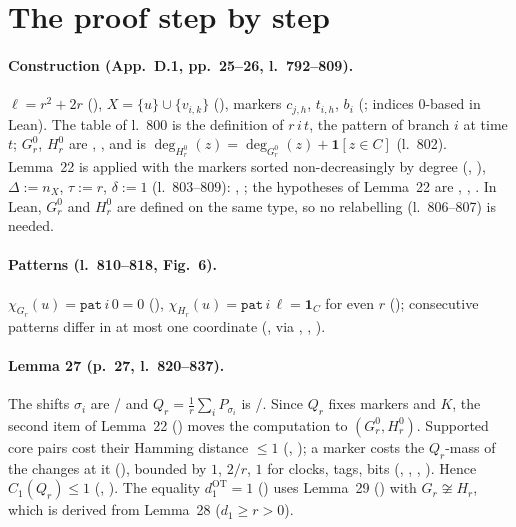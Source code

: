 \section{The proof step by step}

\paragraph{Construction (App.~D.1, pp.~25--26, l.~792--809).} $\ell=r^2+2r$ (),
$X=\{u\}\cup\{v_{i,k}\}$ (), markers $c_{j,h}$, $t_{i,h}$, $b_i$ (; indices 0-based in
Lean). The table of l.~800 is the definition of  $r\,i\,t$, the pattern of branch $i$ at time $t$;
$G^0_r$, $H^0_r$ are , , and  is
$\deg_{H^0_r}(z)=\deg_{G^0_r}(z)+\mathbf 1[z\in C]$ (l.~802). Lemma~22 is applied with the markers sorted
non-decreasingly by degree (, ), $\Delta:=n_X$, $\tau:=r$, $\delta:=1$
(l.~803--809): , ; the hypotheses of Lemma~22 are ,
, . In Lean, $G^0_r$ and $H^0_r$ are defined on the same type, so no
relabelling (l.~806--807) is needed.

\paragraph{Patterns (l.~810--818, Fig.~6).} $\chi_{G_r}(u)=\mathtt{pat}\,i\,0=0$ (),
$\chi_{H_r}(u)=\mathtt{pat}\,i\,\ell=\mathbf 1_C$ for even $r$ (); consecutive patterns differ in
at most one coordinate (, via , ,
).

\paragraph{Lemma 27 (p.~27, l.~820--837).} The shifts $\sigma_i$ are / and
$Q_r=\frac1r\sum_iP_{\sigma_i}$ is /. Since $Q_r$ fixes markers and $K$, the second item of
Lemma~22 () moves the computation to $(G^0_r,H^0_r)$. Supported core pairs cost their
Hamming distance $\le1$ (, ); a marker costs the
$Q_r$-mass of the changes at it (), bounded by $1$, $2/r$, $1$ for clocks, tags,
bits (, , , ). Hence
$C_1(Q_r)\le1$ (, ). The equality
$d_1^{\mathrm{OT}}=1$ () uses Lemma~29 () with $G_r\not\cong H_r$,
which is derived from Lemma~28 ($d_1\ge r>0$).

